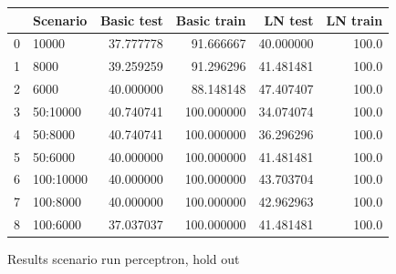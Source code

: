 \documentclass[11pt]{article}
\begin{document}
\begin{figure} 
\begin{tabular}{llrrrr}
\toprule
{} &   Scenario &  Basic test &  Basic train &    LN test &  LN train \\
\midrule
0 &      10000 &   37.777778 &    91.666667 &  40.000000 &     100.0 \\
1 &       8000 &   39.259259 &    91.296296 &  41.481481 &     100.0 \\
2 &       6000 &   40.000000 &    88.148148 &  47.407407 &     100.0 \\
3 &   50:10000 &   40.740741 &   100.000000 &  34.074074 &     100.0 \\
4 &    50:8000 &   40.740741 &   100.000000 &  36.296296 &     100.0 \\
5 &    50:6000 &   40.000000 &   100.000000 &  41.481481 &     100.0 \\
6 &  100:10000 &   40.000000 &   100.000000 &  43.703704 &     100.0 \\
7 &   100:8000 &   40.000000 &   100.000000 &  42.962963 &     100.0 \\
8 &   100:6000 &   37.037037 &   100.000000 &  41.481481 &     100.0 \\
\bottomrule
\end{tabular}
\caption{Results scenario run perceptron, hold out}
\label{Tab::Accuracy perceptron hold out}
\end{figure}
\end{document}
